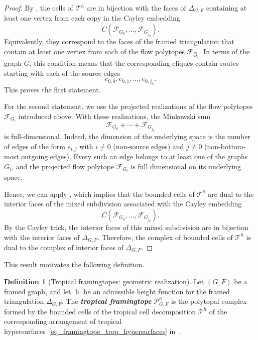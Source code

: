 \documentclass[12pt, reqno]{amsart}
\newcommand{\defn}[1]{{\color{blue!50!black}\textbf{\emph{#1}}}}
\newcommand{\h}{\operatorname{h}}
\theoremstyle{plain}
\theoremstyle{definition}
\newtheorem{definition}[theorem]{Definition}
\numberwithin{equation}{section}
\begin{document}
\begin{proof}
By , the cells of $\mathscr{T}^h$ are in bijection with the faces of $\Delta_{G,F}$ containing at least one vertex from each copy in the Cayley embedding
\[
C(\mathcal{F}_{G_0},\ldots,\mathcal{F}_{G_{j_0}}).
\]
Equivalently, they correspond to the faces of the framed triangulation that contain at least one vertex from each of the flow polytopes $\mathcal{F}_{\hat G_i}$. In terms of the graph $G$, this condition means that the corresponding cliques contain routes starting with each of the source edges
\[
e_{0,0},e_{0,1},\ldots,e_{0,j_0}.
\]
This proves the first statement.

For the second statement, we use the projected realizations of the flow polytopes $\mathcal{F}_{G_i}$ introduced above. With these realizations, the Minkowski sum
\[
\mathcal{F}_{G_0}+\cdots+\mathcal{F}_{G_{j_0}}
\]
is full-dimensional. Indeed, the dimension of the underlying space is the number of edges of the form $e_{i,j}$ with $i\neq 0$ (non-source edges) and $j\neq 0$ (non-bottom-most outgoing edges). Every such an edge belongs to at least one of the graphs $G_i$, and the projected flow polytope $\mathcal{F}_{G_i}$ is full dimensional on its underlying space.

Hence, we can apply , which implies that the bounded cells of $\mathscr{T}^h$ are dual to the interior faces of the mixed subdivision associated with the Cayley embedding
\[
C(\mathcal{F}_{G_0},\ldots,\mathcal{F}_{G_{j_0}}).
\]
By the Cayley trick, the interior faces of this mixed subdivision are in bijection with the interior faces of $\Delta_{G,F}$. Therefore, the complex of bounded cells of $\mathscr{T}^h$ is dual to the complex of interior faces of $\Delta_{G,F}$.
\end{proof}





This result motivates the following definition.

\begin{definition}[Tropical framingtopes: geometric realization]
\label{def_framingtope_asTropical}
Let $(G,F)$ be a framed graph, and let $\h$ be an admissible height function for the framed triangulation $\Delta_{G,F}$. The \defn{tropical framingtope} $\mathscr{P}_{G,F}^h$ is the polytopal complex formed by the bounded cells of the tropical cell decomposition $\mathscr{T}^h$ of the corresponding arrangement of tropical hypersurfaces~\eqref{eq_framingtope_trop_hypersurfaces} in~.
\end{definition}
\end{document}
